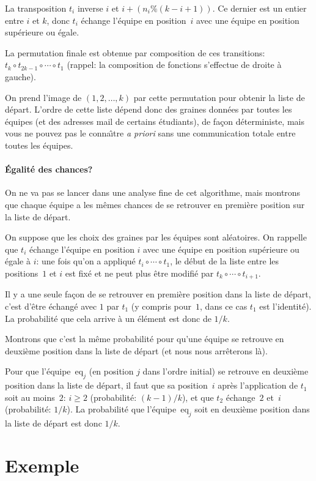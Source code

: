 \documentclass{article}
\newcommand{\nbeq}{k}
\newcommand{\eq}[1]{\text{eq}_{#1}}
\begin{document}
La transposition \(t_i\) inverse \(i\) et
\(i + \left(n_i\%(\nbeq-i+1)\right)\). Ce dernier est un entier entre
\(i\) et \(\nbeq\), donc \(t_i\) \'echange l'\'equipe en
position~\(i\)  avec une \'equipe en position sup\'erieure ou \'egale.

La permutation finale est obtenue par composition de ces transitions:
\(t_{\nbeq}\circ t_{2\nbeq-1}\circ \cdots\circ t_1\) (rappel: la
composition de fonctions s'effectue de droite \`a gauche).

On prend l'image de \((1,2,\ldots,\nbeq)\) par cette permutation pour
obtenir la liste de d\'epart. L'ordre de cette liste d\'epend donc des graines
donn\'ees par toutes les \'equipes (et des adresses mail de certains
\'etudiants), de fa\c con d\'eterministe, mais vous ne pouvez pas le
conna\^{\i}tre \emph{a priori} sans une communication totale entre
toutes les \'equipes.

\paragraph{\'Egalit\'e des chances?} On ne va pas se lancer dans une
analyse fine de cet algorithme, mais montrons que chaque \'equipe a
les m\^emes chances de se retrouver en premi\`ere position sur la
liste de d\'epart.

On suppose que les choix des graines par les \'equipes sont
al\'eatoires. On rappelle que \(t_i\)
\'echange l'\'equipe en position \(i\) avec une \'equipe en position
sup\'erieure ou \'egale \`a \(i\): une fois qu'on a appliqu\'e \(t_i\circ \cdots
\circ t_1\), le d\'ebut de la liste entre les positions~\(1\) et \(i\)
est fix\'e et ne peut plus \^etre modifi\'e par
\(t_\nbeq\circ\cdots\circ t_{i+1}\).

Il y a une seule fa\c con de se retrouver en premi\`ere position dans
la liste de d\'epart, c'est d'\^etre \'echang\'e avec \(1\) par
\(t_1\) (y compris pour~\(1\), dans ce cas \(t_1\) est
l'identit\'e). La probabilit\'e que cela arrive \`a un \'el\'ement est
donc de \(1/\nbeq\).

\medskip

Montrons que c'est la m\^eme probabilit\'e pour qu'une \'equipe se
retrouve en deuxi\`eme position dans la liste de d\'epart (et nous
nous arr\^eterons l\`a).

Pour que l'\'equipe~\(\eq{j}\) (en position \(j\) dans l'ordre initial)
se retrouve en deuxi\`eme position dans la liste de d\'epart, il faut
que sa position~\(i\) apr\`es l'application de \(t_1\) soit au
moins~\(2\): \(i\geq 2\) (probabilit\'e: \((\nbeq-1)/\nbeq\)), et que
\(t_2\) \'echange~\(2\) et~\(i\) (probabilit\'e: \(1/\nbeq\)). La
probabilit\'e que l'\'equipe~\(\eq{j}\) soit en deuxi\`eme position
dans la liste de d\'epart est donc \(1/\nbeq\).

\section{Exemple}
\end{document}
